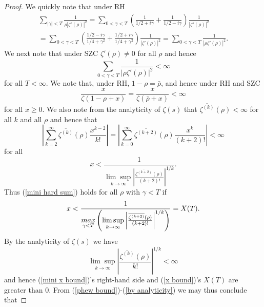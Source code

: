 \documentclass[11pt,article]{amsart}
\numberwithin{equation}{section}
\numberwithin{equation}{section}
\numberwithin{lemma}{section}
\numberwithin{prop}{section}
\begin{document}
\begin{proof}
We quickly note that under RH
\begin{align}
\sum_{\left|\gamma\right|<T}\frac{1}{\rho\left|\zeta'(\rho)\right|^{2}}=\sum_{0<\gamma<T}\left(\frac{1}{1/2+i\gamma}+\frac{1}{1/2-i\gamma}\right)\frac{1}{\left|\zeta'(\rho)\right|^{2}} \nonumber \\ =\sum_{0<\gamma<T}\left(\frac{1/2-i\gamma}{1/4+\gamma^{2}}+\frac{1/2+i\gamma}{1/4+\gamma^{2}}\right)\frac{1}{\left|\zeta'(\rho)\right|^{2}}=\sum_{0<\gamma<T}\frac{1}{\left|\rho \zeta'(\rho)\right|^{2}}.
\label{write it out}
\end{align}
We next note that under SZC $\zeta'(\rho)\neq 0$ for all $\rho$ and hence
\begin{equation}
\sum_{0<\gamma<T}\frac{1}{\left|\rho \zeta'(\rho)\right|^{2}}<\infty \label{easy sum}
\end{equation}
for all $T<\infty$. We note that, under RH, $1-\rho=\bar{\rho}$, and hence under RH and SZC
\begin{equation}
\frac{x}{\zeta(1-\rho+x)}=\frac{x}{\zeta\left(\bar{\rho}+x\right)}<\infty \label{phew bound}
\end{equation}
for all $x\geq 0$. We also note from the analyticity of $\zeta(s)$ that $\overline{\zeta^{(k)}}(\rho)<\infty$ for all $k$ and all $\rho$ and hence that
\begin{equation}
\left|\sum_{k=2}^{\infty}\overline{\zeta^{(k)}}(\rho)\frac{x^{k-2}}{k!}\right|=\left|\sum_{k=0}^{\infty}\overline{\zeta^{(k+2)}}(\rho)\frac{x^{k}}{(k+2)!}\right|<\infty \label{mini hard sum}
\end{equation}
for all 
\begin{equation}
x<\frac{1}{\underset{k\rightarrow \infty}{\lim\sup}\left|\frac{\overline{\zeta^{(k+2)}}(\rho)}{(k+2)!}\right|^{1/k}}. \label{mini x bound}
\end{equation}
Thus (\ref{mini hard sum}) holds for all $\rho$ with $\gamma<T$ if 
\begin{equation}
x<\frac{1}{\underset{\gamma<T}{\textnormal{max}}\left(\underset{k\rightarrow \infty}{\lim\sup}\left|\frac{\overline{\zeta^{(k+2)}}(\rho)}{(k+2)!}\right|^{1/k}\right)}=X(T).
\end{equation}
By the analyticity of $\zeta(s)$ we have
\begin{equation}
\underset{k\rightarrow \infty}{\lim \sup}\left|\frac{\overline{\zeta^{(k)}}(\rho)}{k!}\right|^{1/k}<\infty \label{by analyticity}
\end{equation}
and hence (\ref{mini x bound})'s right-hand side and (\ref{x bound})'s $X(T)$ are greater than $0$. From (\ref{phew bound})-(\ref{by analyticity}) we may thus conclude that 

\end{proof}
\end{document}
